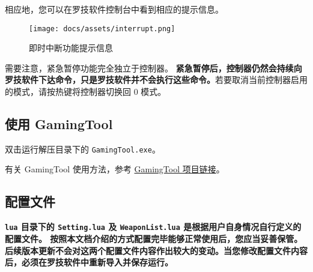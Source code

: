 相应地，您可以在罗技软件控制台中看到相应的提示信息。

\begin{figure}[H]
    \Centering
    \texttt{[image: docs/assets/interrupt.png]}
    \caption{即时中断功能提示信息}
\end{figure}

需要注意，紧急暂停功能完全独立于控制器。
\textbf{\color{red}紧急暂停后，控制器仍然会持续向罗技软件下达命令，只是罗技软件并不会执行这些命令。}若要取消当前控制器启用的模式，请按热键将控制器切换回 0 模式。

\subsection{使用 GamingTool}

双击运行解压目录下的 \lstinline{GamingTool.exe}。

有关 GamingTool 使用方法，参考 \href{https://gitee.com/silver1867/gaming-tool}{GamingTool 项目链接}。

\subsection{配置文件}

\textbf{\color{red}\lstinline{lua} 目录下的 \lstinline{Setting.lua} 及 \lstinline{WeaponList.lua} 是根据用户自身情况自行定义的配置文件。
按照本文档介绍的方式配置完毕能够正常使用后，您应当妥善保管。后续版本更新不会对这两个配置文件内容作出较大的变动。当您修改配置文件内容后，必须在罗技软件中重新导入并保存运行。}
